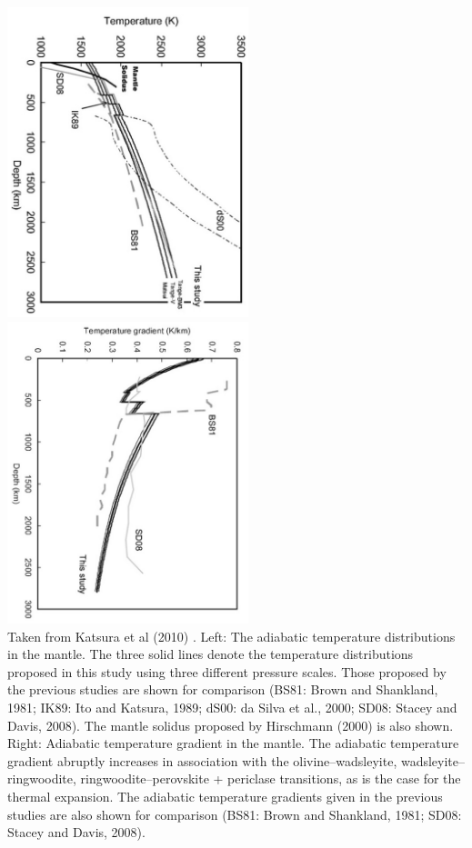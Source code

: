 \begin{center}
\includegraphics[width=7cm]{images/adiabatic/kayy10a}
\includegraphics[width=7cm]{images/adiabatic/kayy10b}\\
{\captionfont Taken from Katsura et al (2010) \cite{kayy10}.
Left: The adiabatic temperature distributions in the mantle. The three solid lines
denote the temperature distributions proposed in this study using three different
pressure scales. Those proposed by the previous studies are shown for comparison
(BS81: Brown and Shankland, 1981; IK89: Ito and Katsura, 1989; dS00: da Silva et al.,
2000; SD08: Stacey and Davis, 2008). The mantle solidus proposed by Hirschmann
(2000) is also shown.
Right:
Adiabatic temperature gradient in the mantle. The adiabatic temperature gradient 
abruptly increases in association with the olivine–wadsleyite,
wadsleyite–ringwoodite, ringwoodite–perovskite + periclase transitions, as is the
case for the thermal expansion. The adiabatic temperature gradients given in the
previous studies are also shown for comparison (BS81: Brown and Shankland, 1981;
SD08: Stacey and Davis, 2008).
}
\end{center}

